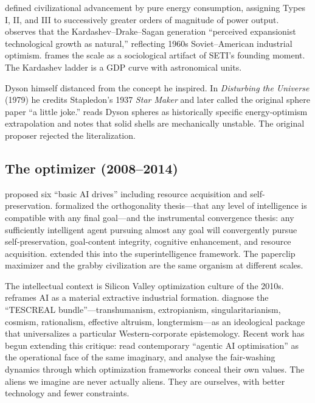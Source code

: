 \documentclass[11pt,a4paper,twocolumn]{article}
\begin{document}
\citet{kardashev1964} defined civilizational advancement by pure energy
consumption, assigning Types I, II, and III to successively greater orders
of magnitude of power output. \citet{cirkovic2015} observes that the
Kardashev--Drake--Sagan generation ``perceived expansionist technological
growth as natural,'' reflecting 1960s Soviet--American industrial
optimism. \citet{dick1996} frames the scale as a sociological artifact of
SETI's founding moment. The Kardashev ladder is a GDP curve with
astronomical units.

Dyson himself distanced from the concept he inspired. In \textit{Disturbing
the Universe} (1979) he credits Stapledon's 1937 \textit{Star Maker} and
later called the original sphere paper ``a little joke.'' \citet{wright2020}
reads Dyson spheres as historically specific energy-optimism extrapolation
and notes that solid shells are mechanically unstable. The original
proposer rejected the literalization.

\subsection{The optimizer (2008--2014)}

\citet{omohundro2008} proposed six ``basic AI drives'' including resource
acquisition and self-preservation. \citet{bostrom2012} formalized the
orthogonality thesis---that any level of intelligence is compatible with
any final goal---and the instrumental convergence thesis: any sufficiently
intelligent agent pursuing almost any goal will convergently pursue
self-preservation, goal-content integrity, cognitive enhancement, and
resource acquisition. \citet{bostrom2014} extended this into the
superintelligence framework. The paperclip maximizer and the grabby
civilization are the same organism at different scales.

The intellectual context is Silicon Valley optimization culture of the
2010s. \citet{crawford2021} reframes AI as a material extractive
industrial formation. \citet{gebru2024} diagnose the ``TESCREAL
bundle''---transhumanism, extropianism, singularitarianism, cosmism,
rationalism, effective altruism, longtermism---as an ideological package
that universalizes a particular Western-corporate epistemology. Recent
work has begun extending this critique: \citet{floridi2026} read
contemporary ``agentic AI optimisation'' as the operational face of the
same imaginary, and \citet{campione2026} analyse the fair-washing
dynamics through which optimization frameworks conceal their own values.
The aliens we imagine are never actually aliens. They are ourselves,
with better technology and fewer constraints.
\end{document}
